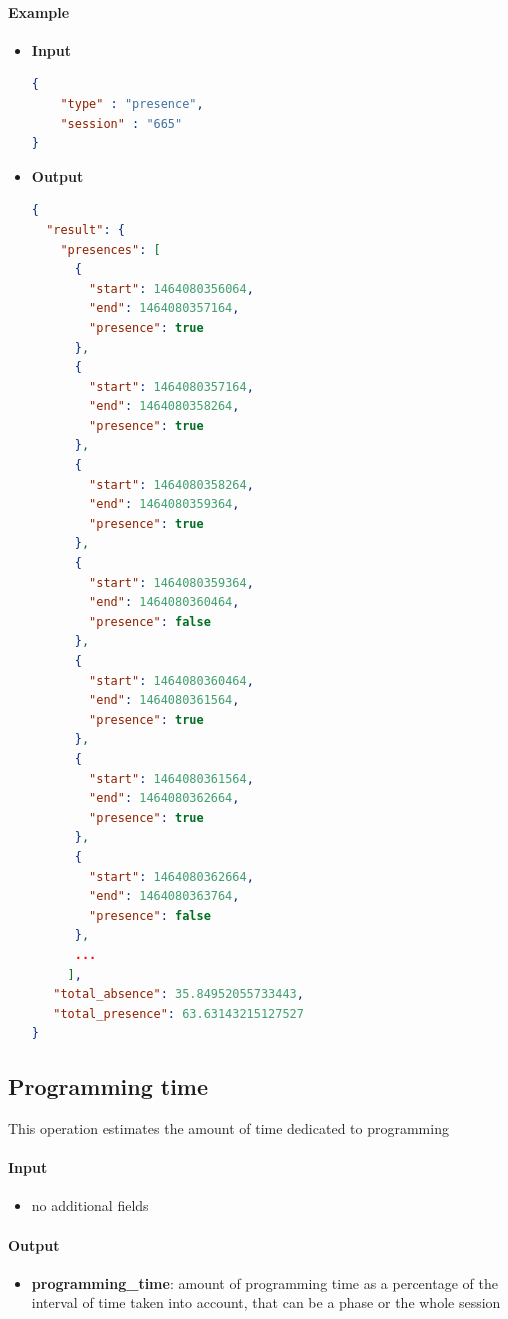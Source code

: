 \documentclass[a4paper,notitlepage,onecolumn]{hitec}  %
\begin{document}
\paragraph{Example}
\begin{itemize}
\item\textbf{Input}
\begin{lstlisting}[language=json,firstnumber=1]
{
    "type" : "presence",
    "session" : "665"
}
\end{lstlisting}
\item\textbf{Output}
\begin{lstlisting}[language=json,firstnumber=1]
{
  "result": {
    "presences": [
      {
        "start": 1464080356064,
        "end": 1464080357164,
        "presence": true
      },
      {
        "start": 1464080357164,
        "end": 1464080358264,
        "presence": true
      },
      {
        "start": 1464080358264,
        "end": 1464080359364,
        "presence": true
      },
      {
        "start": 1464080359364,
        "end": 1464080360464,
        "presence": false
      },
      {
        "start": 1464080360464,
        "end": 1464080361564,
        "presence": true
      },
      {
        "start": 1464080361564,
        "end": 1464080362664,
        "presence": true
      },
      {
        "start": 1464080362664,
        "end": 1464080363764,
        "presence": false
      },
      ...
     ],
   "total_absence": 35.84952055733443,
   "total_presence": 63.63143215127527
}
\end{lstlisting}
\end{itemize}

\subsection{Programming time}
This operation estimates the amount of time dedicated to programming

\paragraph{Input}
\begin{itemize}
\item no additional fields
\end{itemize}

\paragraph{Output}
\begin{itemize}
\item\textbf{programming\_time}: amount of programming time as a percentage of the interval of time taken into account, that can be a phase or the whole session
\end{itemize}
\end{document}
